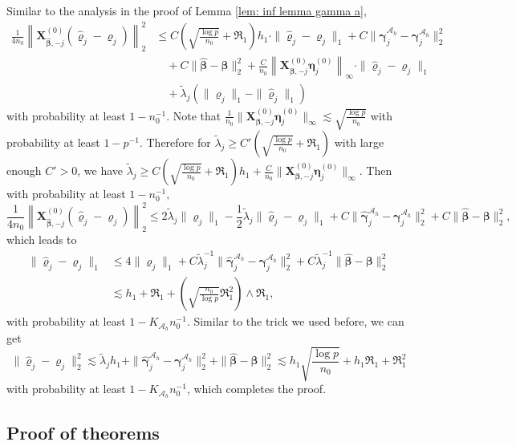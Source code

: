 \documentclass[12pt]{article}
\newcommand{\infnorma}[1]{\left\|#1\right\|_{\infty}}
\newcommand{\twonorma}[1]{\left\|#1\right\|_{2}}
\newcommand{\infnorm}[1]{\|#1\|_{\infty}}
\newcommand{\twonorm}[1]{\|#1\|_{2}}
\newcommand{\onenorm}[1]{\|#1\|_{1}}
\newcommand{\bbeta}{\bm{\beta}}
\newcommand{\hbeta}{\hat{\bm{\beta}}}
\newcommand{\brho}{\bm{\varrho}}
\newcommand{\hrho}{\hat{\bm{\varrho}}}
\newcommand{\tlambda}{\tilde{\lambda}}
\newcommand{\bgammaah}{\bm{\gamma}^{\mah}}
\newcommand{\hgammaah}{\hat{\bm{\gamma}}^{\mah}}
\newcommand{\bXk}[1]{\bm{X}^{(#1)}}
\newcommand{\bmetak}[1]{\bm{\eta}^{(#1)}}
\newcommand{\mah}{\mathcal{A}_h}
\newcommand{\Kah}{K_{\mah}}
\newcommand{\<}{\langle}
\renewcommand{\>}{\rangle}
\begin{document}
Similar to the analysis in the proof of Lemma \ref{lem: inf lemma gamma a},
\begin{align}
	\frac{1}{4n_0}\twonorma{\bXk{0}_{\hbeta, -j}(\hrho_j - \brho_j)}^2 &\leq C\left(\sqrt{\frac{\log p}{n_0}} + \Re_1\right)h_1\cdot \onenorm{\hrho_j - \brho_j} + C\twonorm{\hgammaah_j-\bgammaah_j}^2 \\
	&\quad + C\twonorm{\hbeta - \bbeta}^2 + \frac{C}{n_0}\infnorma{\bXk{0}_{\bbeta, -j}\bmetak{0}_j}\cdot \onenorm{\hrho_j - \brho_j} \\
	&\quad + \tlambda_j(\onenorm{\brho_j} - \onenorm{\hrho_j})
\end{align}
with probability at least $1-n_0^{-1}$. Note that $\frac{1}{n_0}\infnorm{\bXk{0}_{\bbeta, -j}\bmetak{0}_j} \lesssim \sqrt{\frac{\log p}{n_0}}$ with probability at least $1-p^{-1}$. Therefore for $\tlambda_j \geq C'\left(\sqrt{\frac{\log p}{n_0}} + \Re_1\right)$ with large enough $C' > 0$, we have $\tlambda_j \geq C\left(\sqrt{\frac{\log p}{n_0}} + \Re_1\right)h_1 + \frac{C}{n_0}\infnorm{\bXk{0}_{\bbeta, -j}\bmetak{0}_j}$. Then with probability at least $1-n_0^{-1}$,
\begin{equation}
	\frac{1}{4n_0}\twonorma{\bXk{0}_{\hbeta, -j}(\hrho_j - \brho_j)}^2 \leq  2\tlambda_j\onenorm{\brho_j} - \frac{1}{2}\tlambda_j\onenorm{\hrho_j-\brho_j} + C\twonorm{\hgammaah_j-\bgammaah_j}^2 + C\twonorm{\hbeta - \bbeta}^2,
\end{equation}
which leads to
\begin{align}
	\onenorm{\hrho_j-\brho_j} &\leq 4\onenorm{\brho_j} + C\tlambda_j^{-1}\twonorm{\hgammaah_j-\bgammaah_j}^2 + C\tlambda_j^{-1}\twonorm{\hbeta - \bbeta}^2 \\
	&\lesssim h_1 + \Re_1 + \left(\sqrt{\frac{n_0}{\log p}}\Re_1^2\right) \wedge \Re_1,
\end{align}
with probability at least $1-\Kah n_0^{-1}$.
Similar to the trick we used before, we can get
\begin{equation}
	\twonorm{\hrho_j-\brho_j}^2 \lesssim \tlambda_j h_1 + \twonorm{\hgammaah_j-\bgammaah_j}^2 + \twonorm{\hbeta - \bbeta}^2 \lesssim h_1\sqrt{\frac{\log p}{n_0}} + h_1\Re_1 + \Re_1^2
\end{equation}
with probability at least $1-\Kah n_0^{-1}$, which completes the proof.

\subsection{Proof of theorems}
\end{document}
